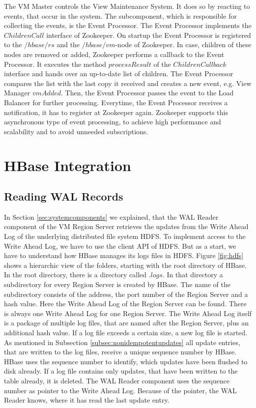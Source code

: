 \documentclass[11pt,a4paper,bibtotoc,idxtotoc,headsepline,footsepline,footexclude,BCOR12mm,DIV13]{scrbook}
\begin{document}
The VM Master controls the View Maintenance System. It does so by reacting to events, that occur in the system. The subcomponent, which is responsible for collecting the events, is the Event Processor. The Event Processor implements the $ChildrenCall$ interface of Zookeeper. On startup the Event Processor is registered to the $/hbase/rs$ and the $/hbase/vm$-node of Zookeeper. In case, children of these nodes are removed or added, Zookeeper performs a callback to the Event Processor. It executes the method $processResult$ of the $ChildrenCallback$ interface and hands over an up-to-date list of children. The Event Processor compares the list with the last copy it received and creates a new event, e.g. View Manager $vmAdded$. Then, the Event Processor passes the event to the Load Balancer for further processing. Everytime, the Event Processor receives a notification, it has to register at Zookeeper again. Zookeeper supports this asynchronous type of event processing, to achieve high performance and scalability and to avoid unneeded subscriptions.
     

\section{HBase Integration}

\subsection{Reading WAL Records}
\label{subsec:readingthewal}

In Section \ref{sec:systemcomponents} we explained, that the WAL Reader component of the VM Region Server retrieves the updates from the Write Ahead Log of the underlying distributed file system HDFS. To implement access to the Write Ahead Log, we have to use the client API of HDFS. But as a start, we have to understand how HBase manages its logs files in HDFS. Figure \ref{fig:hdfs} shows a hierarchic view of the folders, starting with the root directory of HBase. In the root directory, there is a directory called $.logs$. In that directory a subdirectory for every Region Server is created by HBase. The name of the subdirectory consists of the address, the port number of the Region Server and a hash value. Here the Write Ahead Log of the Region Server can be found. There is always one Write Ahead Log for one Region Server. The Write Ahead Log itself is a package of multiple log files, that are named after the Region Server, plus an additional hash value. If a log file exceeds a certain size, a new log file is started. As mentioned in Subsection \ref{subsec:nonidempotentupdates} all update entries, that are written to the log files, receive a unique sequence number by HBase. HBase uses the sequence number to identify, which updates have been flushed to disk already. If a log file contains only updates, that have been written to the table already, it is deleted. The WAL Reader component uses the sequence number as pointer to the Write Ahead Log. Because of the pointer, the WAL Reader knows, where it has read the last update entry.\\
\end{document}
